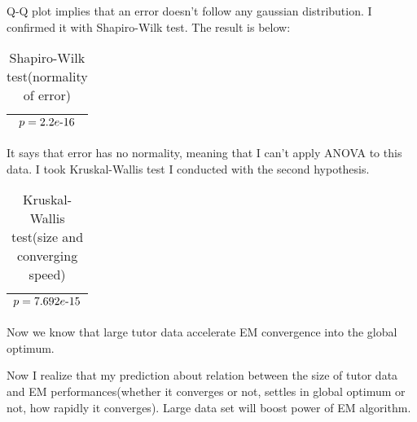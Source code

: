 \documentclass[uplatex]{jsarticle}
\newcommand{\mathhyphen}{\mathchar`-}
\begin{document}
	Q-Q plot implies that an error doesn't follow any gaussian distribution. I confirmed it with Shapiro-Wilk test. The result is below:
	\begin{table}[h]
	  \centering
	  \caption{Shapiro-Wilk test(normality of error)}
	  \begin{tabular}{c}
	    \hline \hline
	    $p = 2.2e\mathhyphen 16$
	    \\ \hline \hline
	  \end{tabular}
	  \label{tab:SandS}
	\end{table}
	It says that error has no normality, meaning that I can't apply ANOVA to this data. I took Kruskal-Wallis test I conducted with the second hypothesis.
	\begin{table}[h]
	  \centering
	  \caption{Kruskal-Wallis test(size and converging speed)}
	  \begin{tabular}{c}
	    \hline \hline
	    $p = 7.692e\mathhyphen 15$
	    \\ \hline \hline
	  \end{tabular}
	  \label{tab:SandS}
	\end{table}
	Now we know that large tutor data accelerate EM convergence into the global optimum.
      \par
      \indent
	Now I realize that my prediction about relation between the size of tutor data and EM performances(whether it converges or not, settles in global optimum or not, how rapidly it converges). Large data set will boost power of EM algorithm.
      \par
%
\end{document}
